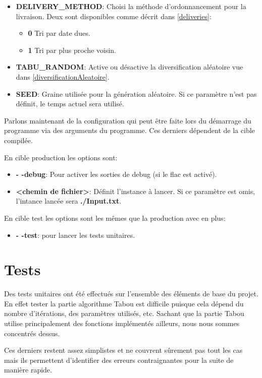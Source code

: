 \documentclass[hideweeklyreports]{polytech/polytech}
\begin{document}
\begin{itemize}
				\item \textbf{DELIVERY\_METHOD}: Choisi la méthode d'ordonnancement pour la livraison. Deux sont disponibles comme décrit dans \autoref{deliveries}:
				\begin{itemize}
					\item \textbf{0} Tri par date dues.
					\item \textbf{1} Tri par plus proche voisin.
				\end{itemize}
				\item \textbf{TABU\_RANDOM}: Active ou désactive la diversification aléatoire vue dans \autoref{diversificationAleatoire}.
				\item \textbf{SEED}: Graine utilisée pour la génération aléatoire. Si ce paramètre n'est pas définit, le temps actuel sera utilisé.
			\end{itemize}
			
			Parlons maintenant de la configuration qui peut être faite lors du démarrage du programme via des arguments du programme. Ces derniers dépendent de la cible compilée.
			
			En cible production les options sont:
			\begin{itemize}
				\item \textbf{- -debug}: Pour activer les sorties de debug (si le flac est activé).
				\item \textbf{<chemin de fichier>}: Définit l'instance à lancer. Si ce paramètre est omis, l'intance lancée sera \textbf{./Input.txt}.
			\end{itemize}
			
			En cible test les options sont les mêmes que la production avec en plus:
			\begin{itemize}
				\item \textbf{- -test}: pour lancer les tests unitaires.
			\end{itemize}
		
		\section{\label{unit}Tests}
			Des tests unitaires ont été effectués sur l'ensemble des éléments de base du projet. En effet tester la partie algorithme Tabou est difficile puisque cela dépend du nombre d'itérations, des paramètres utilisés, etc. Sachant que la partie Tabou utilise principalement des fonctions implémentés ailleurs, nous nous sommes concentrés dessus.
			
			Ces derniers restent assez simplistes et ne couvrent sûrement pas tout les cas mais ils permettent d'identifier des erreurs contraignantes pour la suite de manière rapide.
			
\end{document}
